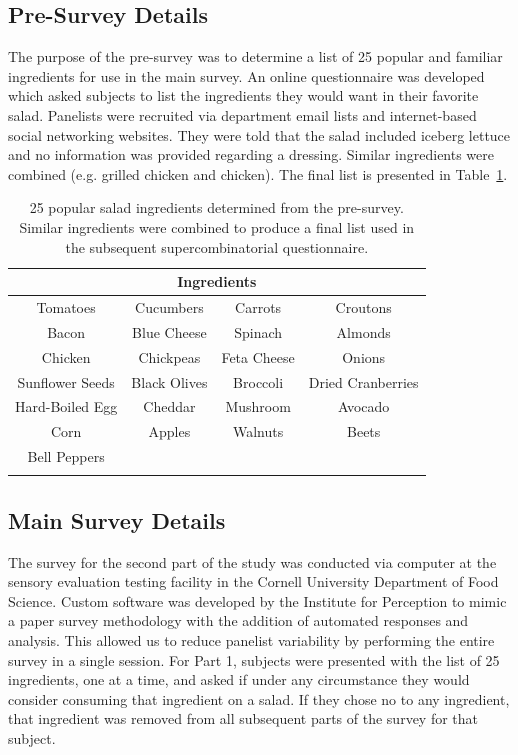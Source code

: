 \subsection{Pre-Survey Details}
The purpose of the pre-survey was to determine a list of 25 popular and familiar ingredients for use in the main survey.  An online questionnaire was developed which asked subjects to list the ingredients they would want in their favorite salad.  Panelists were recruited via department email lists and internet-based social networking websites. They were told that the salad included iceberg lettuce and no information was provided regarding a dressing.  Similar ingredients were combined (e.g. grilled chicken and chicken).  The final list is presented in Table~\ref{tab:salading}.


\begin{table}[h!b!p!]
\centering
\caption[25 popular salad ingredients]{25 popular salad ingredients determined from the pre-survey.  Similar ingredients were combined to produce a final list used in the subsequent supercombinatorial questionnaire.}
\begin{tabular}{cccc}
\toprule
\multicolumn{4}{c}{Ingredients} \\
\midrule
Tomatoes 		& 	Cucumbers 	& 	Carrots 	& 	Croutons 	\\
Bacon 			&	Blue Cheese 	& 	Spinach 	& 	Almonds 	\\
Chicken 		& 	Chickpeas 	& 	Feta Cheese 	& 	Onions 	\\
Sunflower Seeds 	& 	Black Olives 	& 	Broccoli 	&	Dried Cranberries \\
Hard-Boiled Egg 	& 	Cheddar 	& 	Mushroom 	& 	Avocado 	\\
Corn 			& 	Apples 		& 	Walnuts 	& 	Beets 		\\
Bell Peppers \\
\bottomrule
\label{tab:salading}
\end{tabular}
\end{table}

\subsection{Main Survey Details}
The survey for the second part of the study was conducted via computer at the sensory evaluation testing facility in the Cornell University Department of Food Science.  Custom software was developed by the Institute for Perception  to mimic a paper survey methodology with the addition of automated responses and analysis.  This allowed us to reduce panelist variability by performing the entire survey in a single session.  For Part 1, subjects were presented with the list of 25 ingredients, one at a time, and asked if under any circumstance they would consider consuming that ingredient on a salad.  If they chose no to any ingredient, that ingredient was removed from all subsequent parts of the survey for that subject.  

